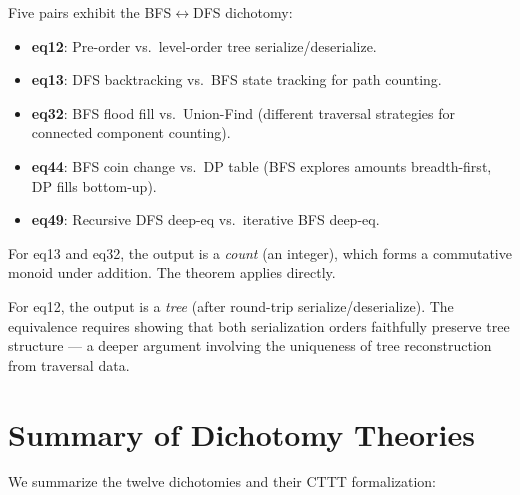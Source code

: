 \documentclass[11pt,a4paper]{report}
\theoremstyle{definition}
\theoremstyle{plain}
\begin{document}
Five pairs exhibit the BFS$\leftrightarrow$DFS dichotomy:
\begin{itemize}
  \item \textbf{eq12}: Pre-order vs.\ level-order tree
    serialize/deserialize.
  \item \textbf{eq13}: DFS backtracking vs.\ BFS state tracking for
    path counting.
  \item \textbf{eq32}: BFS flood fill vs.\ Union-Find (different
    traversal strategies for connected component counting).
  \item \textbf{eq44}: BFS coin change vs.\ DP table (BFS explores
    amounts breadth-first, DP fills bottom-up).
  \item \textbf{eq49}: Recursive DFS deep-eq vs.\ iterative BFS
    deep-eq.
\end{itemize}

For eq13 and eq32, the output is a \emph{count} (an integer), which
forms a commutative monoid under addition.  The theorem applies directly.

For eq12, the output is a \emph{tree} (after round-trip
serialize/deserialize).  The equivalence requires showing that both
serialization orders faithfully preserve tree structure --- a deeper
argument involving the uniqueness of tree reconstruction from traversal
data.


\chapter{Summary of Dichotomy Theories}
\label{ch:dichotomy-summary}

We summarize the twelve dichotomies and their CTTT formalization:
\end{document}
